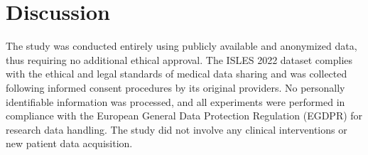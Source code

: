 \documentclass[12pt]{article}
\begin{document}
\begin{table}[tp]
\centering
{}
\caption{Comparison of segmentation models on the test set (N=25). The nnU-Net achieved the highest Dice and IoU scores, indicating superior segmentation accuracy and robustness. YOLOv8 provided competitive performance with efficient inference, while U-Net showed limited generalization capabilities.}
\label{tab:comparison}
\end{table}

\section{Discussion}\label{sec:discussion}


The study was conducted entirely using publicly available and anonymized data, thus requiring no additional ethical approval. The ISLES 2022 dataset complies with the ethical and legal standards of medical data sharing and was collected following informed consent procedures by its original providers.
%
No personally identifiable information was processed, and all experiments were performed in compliance with the European General Data Protection Regulation (EGDPR) for research data handling. The study did not involve any clinical interventions or new patient data acquisition.
\end{document}
